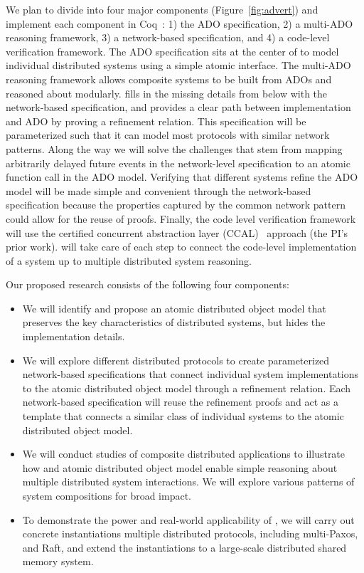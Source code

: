 \documentclass[11pt]{article}
\begin{document}
We plan to divide \sysname{} into four major components
(Figure~\ref{fig:advert}) and implement each component in
Coq~\cite{coq}: 1) the ADO specification, 2) a multi-ADO reasoning
framework, 3) a network-based specification, and 4) a code-level
verification framework.  The ADO specification sits at the center of
\sysname{} to model individual distributed systems using a simple
atomic interface. The multi-ADO reasoning framework allows composite
systems to be built from ADOs and reasoned about modularly. \sysname{}
fills in the missing details from below with the network-based
specification, and provides a clear path between implementation and
ADO by proving a refinement relation. This specification will be
parameterized such that it can model most protocols with similar
network patterns. Along the way we will solve the challenges that stem
from mapping arbitrarily delayed future events in the network-level
specification to an atomic function call in the ADO model. Verifying
that different systems refine the ADO model will be made simple and
convenient through the network-based specification because the
properties captured by the common network pattern could allow for the
reuse of proofs. Finally, the code level verification framework will
use the certified concurrent abstraction layer
(CCAL)~\cite{concurrency} approach (the PI's prior work).  \sysname{}
will take care of each step to connect the code-level implementation
of a system up to multiple distributed system reasoning.

Our proposed research consists of the following four components:
\begin{itemize}%
\item We will identify and propose an atomic distributed object model
  that preserves the key characteristics of distributed systems, but
  hides the implementation details.
\item We will explore different distributed protocols to create
  parameterized network-based specifications that connect individual
  system implementations to the atomic distributed object model
  through a refinement relation. Each network-based specification will
  reuse the refinement proofs and act as a template that connects a
  similar class of individual systems to the atomic distributed object
  model.
\item We will conduct studies of composite distributed applications to
  illustrate how \sysname{} and atomic distributed object model enable
  simple reasoning about multiple distributed system interactions. We
  will explore various patterns of system compositions for broad
  impact.
\item To demonstrate the power and real-world applicability of
  \sysname{}, we will carry out concrete instantiations multiple
  distributed protocols, including multi-Paxos, and Raft, and extend
  the instantiations to a large-scale distributed shared memory
  system.
\end{itemize}
\end{document}
